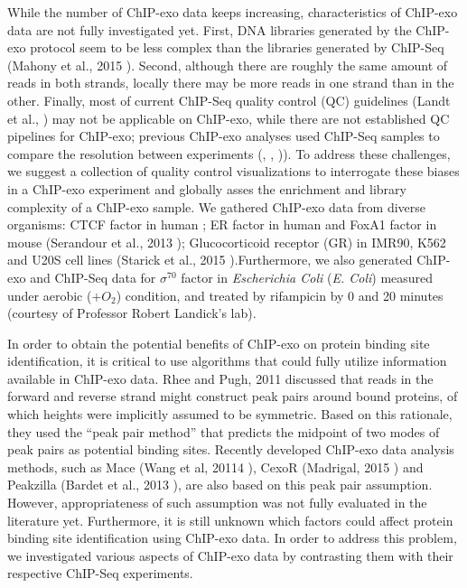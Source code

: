 \documentclass{bmcart}\usepackage[]{graphicx}\usepackage[]{color}
\newcommand{\sig}{\sigma^{70}}
\begin{document}
While the number of ChIP-exo data keeps increasing, characteristics of
ChIP-exo data are not fully investigated yet. First, DNA libraries
generated by the ChIP-exo protocol seem to be less complex than the
libraries generated by ChIP-Seq (Mahony et al., 2015
\cite{exo_review}). Second, although there are roughly the same amount
of reads in both strands, locally there may be more reads in one
strand than in the other. Finally, most of current ChIP-Seq quality
control (QC) guidelines (Landt et al., \cite{encode_qc}) may not be
applicable on ChIP-exo, while there are not established QC pipelines
for ChIP-exo; previous ChIP-exo analyses used ChIP-Seq samples to
compare the resolution between experiments (\cite{exo1},
\cite{exoillumina}, \cite{exo2})). To address these challenges, we
suggest a collection of quality control visualizations to interrogate
these biases in a ChIP-exo experiment and globally asses the
enrichment and library complexity of a ChIP-exo sample. We gathered
ChIP-exo data from diverse organisms: CTCF factor in human
\cite{exo1}; ER factor in human and FoxA1 factor in mouse (Serandour
et al., 2013 \cite{exoillumina}); Glucocorticoid receptor (GR) in
IMR90, K562 and U20S cell lines (Starick et al., 2015
\cite{starick15}).Furthermore, we also generated ChIP-exo and ChIP-Seq
data for $\sig$ factor in \emph{Escherichia Coli} (\emph{E. Coli})
measured under aerobic ($ + O_2$) condition, and treated by rifampicin
by 0 and 20 minutes (courtesy of Professor Robert Landick's lab).

In order to obtain the potential benefits of ChIP-exo on protein
binding site identification, it is critical to use algorithms that
could fully utilize information available in ChIP-exo data. Rhee and
Pugh, 2011 \cite{exo1} discussed that reads in the forward and reverse
strand might construct peak pairs around bound proteins, of which
heights were implicitly assumed to be symmetric. Based on this
rationale, they used the ``peak pair method'' that predicts the
midpoint of two modes of peak pairs as potential binding
sites. Recently developed ChIP-exo data analysis methods, such as Mace
(Wang et al, 20114 \cite{mace}), CexoR (Madrigal, 2015 \cite{cexor})
and Peakzilla (Bardet et al., 2013 \cite{peakzilla}), are also based
on this peak pair assumption. However, appropriateness of such
assumption was not fully evaluated in the literature yet. Furthermore,
it is still unknown which factors could affect protein binding site
identification using ChIP-exo data. In order to address this problem,
we investigated various aspects of ChIP-exo data by contrasting them
with their respective ChIP-Seq experiments.
\end{document}
